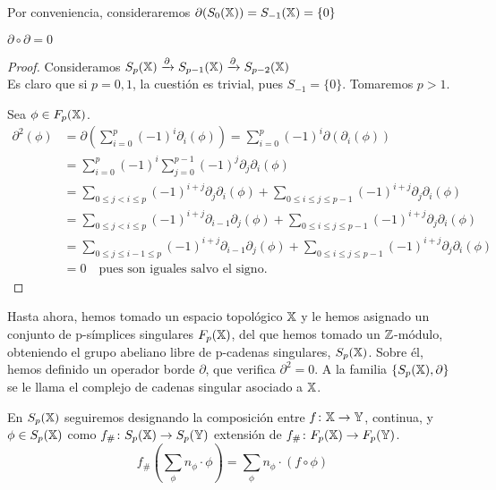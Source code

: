 Por conveniencia, consideraremos $\partial(S_0({\mathbb X})) = S_{-1}({\mathbb X}) = \{0\}$


\begin{proposition}
  $\partial \circ \partial = 0$
\end{proposition}

\begin{proof}
  Consideramos $S_p({\mathbb X}) \xrightarrow{\partial} S_{p-1}({\mathbb X}) \xrightarrow{\partial} S_{p-2}({\mathbb X})$ \\
  Es claro que si $p = 0, 1$, la cuestión es trivial, pues $S_{-1} = \{0\}$. Tomaremos $p > 1$.

  Sea $\phi \in F_{p}({\mathbb X})$.
  \begin{align*}
    \partial^2(\phi) &= \partial(\sum_{i = 0}^p (-1)^i \partial_i(\phi)) = \sum_{i = 0}^p (-1)^i \partial(\partial_i(\phi)) \\
                     &= \sum_{i = 0}^p (-1)^i \sum_{j = 0}^{p-1} (-1)^j \partial_j \partial_i(\phi) \\
                     &= \sum_{0 \leq j < i \leq p} (-1)^{i + j} \partial_j \partial_i(\phi)
                        + \sum_{0 \leq i \leq j \leq p-1} (-1)^{i + j} \partial_j \partial_i(\phi) \\
                     &= \sum_{0 \leq j < i \leq p} (-1)^{i + j} \partial_{i-1} \partial_j(\phi)
                        + \sum_{0 \leq i \leq j \leq p-1} (-1)^{i + j} \partial_j \partial_i(\phi) \\
                     &= \sum_{0 \leq j \leq i-1 \leq p} (-1)^{i + j} \partial_{i-1} \partial_j(\phi)
                        + \sum_{0 \leq i \leq j \leq p-1} (-1)^{i + j} \partial_j \partial_i(\phi) \\
                     &= 0 \quad \text{pues son iguales salvo el signo.}
  \end{align*}
\end{proof}

Hasta ahora, hemos tomado un espacio topológico ${\mathbb X}$ y le hemos asignado un conjunto de p-símplices singulares $F_{p}({\mathbb X})$, del que
hemos tomado un $\mathbb{Z}$-módulo, obteniendo el grupo abeliano libre de p-cadenas singulares, $S_p({\mathbb X})$. Sobre él, hemos definido un
operador borde $\partial$, que verifica $\partial^2 = 0$. A la familia $\{S_p({\mathbb X}), \partial\}$ se le llama el complejo de cadenas
singular asociado a ${\mathbb X}$.

En $S_p({\mathbb X})$ seguiremos designando la composición entre $f \colon {\mathbb X} \to {\mathbb Y}$, continua, y $\phi \in S_p({\mathbb X})$ como $f_\# \colon S_p({\mathbb X}) \to S_p({\mathbb Y})$
extensión de $f_\# \colon F_{p}({\mathbb X}) \to F_{p}({\mathbb Y})$.
\[ f_\#(\sum_\phi n_\phi \cdot \phi) = \sum_\phi n_\phi \cdot (f \circ \phi) \]

